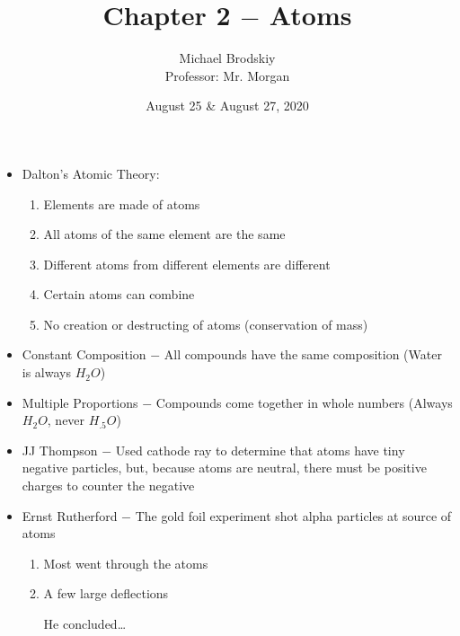 \documentclass[12pt]{article}
\title{Chapter 2 $-$ Atoms}
\date{August 25 \& August 27, 2020}
\author{Michael Brodskiy\\ \small Professor: Mr. Morgan}
\begin{document}
\maketitle

\begin{itemize}

  \item Dalton's Atomic Theory:

    \begin{enumerate}

      \item Elements are made of atoms

      \item All atoms of the same element are the same

      \item Different atoms from different elements are different

      \item Certain atoms can combine

      \item No creation or destructing of atoms (conservation of mass)

    \end{enumerate}

  \item Constant Composition $-$ All compounds have the same composition (Water is always $H_2O$)

  \item Multiple Proportions $-$ Compounds come together in whole numbers  (Always $H_2O$, never $H_{.5}O$)

  \item JJ Thompson $-$ Used cathode ray to determine that atoms have tiny negative particles, but, because atoms are neutral, there must be positive charges to counter the negative

  \item Ernst Rutherford $-$ The gold foil experiment shot alpha particles at source of atoms
    
    \begin{enumerate}

      \item Most went through the atoms

      \item A few large deflections

        \begin{center} He concluded\dots\end{center}


\end{enumerate}
\end{itemize}
\end{document}
